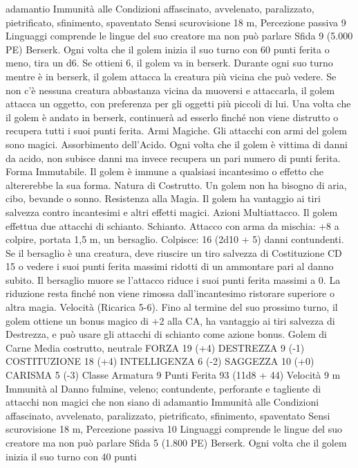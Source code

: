 \begin{multicols}{2}
adamantio
Immunità alle Condizioni affascinato, avvelenato, paralizzato,
pietrificato, sfinimento, spaventato
Sensi scurovisione 18 m, Percezione passiva 9
Linguaggi comprende le lingue del suo creatore ma non può
parlare
Sfida 9 (5.000 PE)
Berserk. Ogni volta che il golem inizia il suo turno con 60 punti
ferita o meno, tira un d6. Se ottieni 6, il golem va in berserk.
Durante ogni suo turno mentre è in berserk, il golem attacca la
creatura più vicina che può vedere. Se non c’è nessuna creatura
abbastanza vicina da muoversi e attaccarla, il golem attacca un
oggetto, con preferenza per gli oggetti più piccoli di lui. Una
volta che il golem è andato in berserk, continuerà ad esserlo
finché non viene distrutto o recupera tutti i suoi punti ferita.
Armi Magiche. Gli attacchi con armi del golem sono magici.
Assorbimento dell’Acido. Ogni volta che il golem è vittima di
danni da acido, non subisce danni ma invece recupera un pari
numero di punti ferita.
Forma Immutabile. Il golem è immune a qualsiasi incantesimo o
effetto che altererebbe la sua forma.
Natura di Costrutto. Un golem non ha bisogno di aria, cibo,
bevande o sonno.
Resistenza alla Magia. Il golem ha vantaggio ai tiri salvezza
contro incantesimi e altri effetti magici.
Azioni
Multiattacco. Il golem effettua due attacchi di schianto.
Schianto. Attacco con arma da mischia: +8 a colpire, portata 1,5
m, un bersaglio.
Colpisce: 16 (2d10 + 5) danni contundenti. Se il bersaglio è una
creatura, deve riuscire un tiro salvezza di Costituzione CD 15 o
vedere i suoi punti ferita massimi ridotti di un ammontare pari al
danno subito. Il bersaglio muore se l’attacco riduce i suoi punti
ferita massimi a 0. La riduzione resta finché non viene rimossa
dall’incantesimo ristorare superiore o altra magia.
Velocità (Ricarica 5-6). Fino al termine del suo prossimo turno,
il golem ottiene un bonus magico di +2 alla CA, ha vantaggio ai
tiri salvezza di Destrezza, e può usare gli attacchi di schianto
come azione bonus.
Golem di Carne
Media costrutto, neutrale
FORZA 19 (+4)
DESTREZZA 9 (-1)
COSTITUZIONE 18 (+4)
INTELLIGENZA 6 (-2)
SAGGEZZA 10 (+0)
CARISMA 5 (-3)
Classe Armatura 9
Punti Ferita 93 (11d8 + 44)
Velocità 9 m
Immunità al Danno fulmine, veleno; contundente, perforante e
tagliente di attacchi non magici che non siano di adamantio
Immunità alle Condizioni affascinato, avvelenato, paralizzato,
pietrificato, sfinimento, spaventato
Sensi scurovisione 18 m, Percezione passiva 10
Linguaggi comprende le lingue del suo creatore ma non può
parlare
Sfida 5 (1.800 PE)
Berserk. Ogni volta che il golem inizia il suo turno con 40 punti

\end{multicols}

